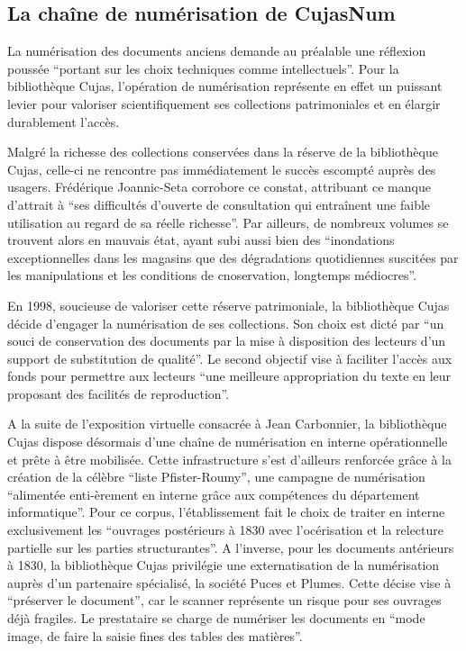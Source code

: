 \subsection[chaîne de numérisation]{La chaîne de numérisation de CujasNum}

La numérisation des documents anciens demande au préalable une réflexion poussée \enquote{portant sur les choix techniques comme intellectuels}. Pour la bibliothèque Cujas, l'opération de numérisation représente en effet un puissant levier pour valoriser scientifiquement ses collections patrimoniales et en élargir durablement l'accès.

Malgré la richesse des collections conservées dans la réserve de la bibliothèque Cujas, celle-ci ne rencontre pas immédiatement le succès escompté auprès des usagers. Frédérique Joannic-Seta corrobore ce constat, attribuant ce manque d'attrait à \enquote{ses difficultés d'ouverte de consultation qui entraînent une faible utilisation au regard de sa réelle richesse}. Par ailleurs, de nombreux volumes se trouvent alors en mauvais état, ayant subi aussi bien des \enquote{inondations exceptionnelles dans les magasins que des dégradations quotidiennes suscitées par les manipulations et les conditions de cnoservation, longtemps médiocres}. 

En 1998, soucieuse de valoriser cette réserve patrimoniale, la bibliothèque Cujas décide d'engager la numérisation de ses collections. Son choix est dicté par \enquote{un souci de conservation des documents par la mise à disposition des lecteurs d'un support de substitution de qualité}. Le second objectif vise à faciliter l'accès aux fonds pour permettre aux lecteurs \enquote{une meilleure appropriation du texte en leur proposant des facilités de reproduction}. 

A la suite de l'exposition virtuelle consacrée à Jean Carbonnier, la bibliothèque Cujas dispose désormais d'une chaîne de numérisation en interne opérationnelle et prête à être mobilisée. Cette infrastructure s'est d'ailleurs renforcée grâce à la création de la célèbre \enquote{liste Pfister-Roumy}, une campagne de numérisation \enquote{alimentée enti-èrement en interne grâce aux compétences du département informatique}. Pour ce corpus, l'établissement fait le choix de traiter en interne exclusivement les \enquote{ouvrages postérieurs à 1830 avec l'océrisation et la relecture partielle sur les parties structurantes}. A l'inverse, pour les documents antérieurs à 1830, la bibliothèque Cujas privilégie une externatisation de la numérisation auprès d'un partenaire spécialisé, la société Puces et Plumes. Cette décise vise à \enquote{préserver le document}, car le scanner représente un risque pour ses ouvrages déjà fragiles. Le prestataire se charge de numériser les documents en \enquote{mode image, de faire la saisie fines des tables des matières}. 

